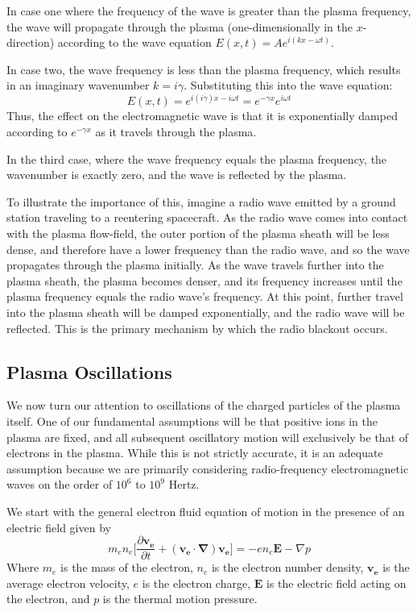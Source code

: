 \documentclass[twocolumn]{article}
\begin{document}
In case one where the frequency of the wave is greater than the plasma frequency, the wave will propagate through the plasma (one-dimensionally in the $x$-direction) according to the wave equation $E(x,t) = Ae^{i(kx - \omega t)}$.

In case two, the wave frequency is less than the plasma frequency, which results in an imaginary wavenumber $k = i\gamma$.
Substituting this into the wave equation:
\begin{equation}
	E(x,t) = e^{i(i\gamma)x - i\omega t} = e^{-\gamma x}e^{i\omega t}
\end{equation}
Thus, the effect on the electromagnetic wave is that it is exponentially damped according to $e^{-\gamma x}$ as it travels through the plasma.

In the third case, where the wave frequency equals the plasma frequency, the wavenumber is exactly zero, and the wave is reflected by the plasma.

To illustrate the importance of this, imagine a radio wave emitted by a ground station traveling to a reentering spacecraft.
As the radio wave comes into contact with the plasma flow-field, the outer portion of the plasma sheath will be less dense, and therefore have a lower frequency than the radio wave, and so the wave propagates through the plasma initially.
As the wave travels further into the plasma sheath, the plasma becomes denser, and its frequency increases until the plasma frequency equals the radio wave's frequency.
At this point, further travel into the plasma sheath will be damped exponentially, and the radio wave will be reflected.
This is the primary mechanism by which the radio blackout occurs.

\subsection*{Plasma Oscillations}
We now turn our attention to oscillations of the charged particles of the plasma itself.
One of our fundamental assumptions will be that positive ions in the plasma are fixed, and all subsequent oscillatory motion will exclusively be that of electrons in the plasma.
While this is not strictly accurate, it is an adequate assumption because we are primarily considering radio-frequency electromagnetic waves on the order of $10^6$ to $10^9$ Hertz.

We start with the general electron fluid equation of motion in the presence of an electric field given by
\begin{equation} \label{eq:emotionhot}
m_en_e \lbrack \frac{\partial \mathbf{v_e}}{\partial t} + \left( \mathbf{v_e} \cdot \mathbf{\nabla} \right) \mathbf{v_e} \rbrack = -en_e\mathbf{E} - \nabla p
\end{equation}
Where $m_e$ is the mass of the electron, $n_e$ is the electron number density, $\mathbf{v_e}$ is the average electron velocity, $e$ is the electron charge, $\mathbf{E}$ is the electric field acting on the electron, and $p$ is the thermal motion pressure.
\end{document}
